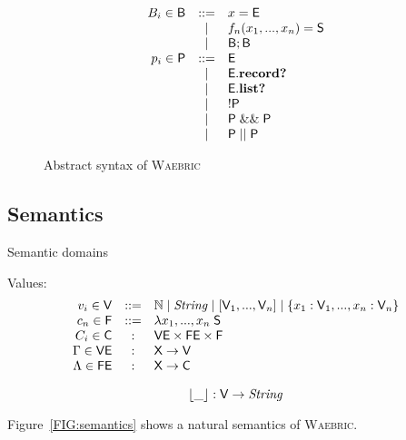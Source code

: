 \documentclass[a4paper]{article}
\def\waebric{\textsc{Waebric}\xspace}
\def\V#1{\ensuremath{\mbox{\textit{#1}}}}
\def\tostring#1{\ensuremath{\lfloor #1\rfloor}}
\begin{document}
\begin{figure}
\begin{minipage}[t]{0.33\linewidth}
\[\begin{array}{rcl}
\end{array}
\]
\end{minipage}
\begin{minipage}[t]{0.33\linewidth}\small
\[
\begin{array}{rcl}
B_i\in \mathsf{B} & ::= & x = \mathsf{E} \\
& | & f_n(x_1, ..., x_n) = \mathsf{S}\\
& | & \mathsf{B} ; \mathsf{B}\\
p_i \in \mathsf{P} & ::= & \mathsf{E}\\
& | & \mathsf{E}.\text{\textbf{record?}}\\
& | & \mathsf{E}.\text{\textbf{list?}}\\
& | & !\mathsf{P} \\
& | & \mathsf{P}\; \&\&\; \mathsf{P}\\
& | & \mathsf{P}\; ||\; \mathsf{P}\\
\end{array}
\]
\end{minipage}
\caption{Abstract syntax of \waebric\label{FIG:abstract-syntax}}
\end{figure}

\subsection{Semantics}


Semantic domains

Values:
\[
\begin{array}{rcl}
v_i \in \NT{V} &::=& \mathbb{N} \;|\; \V{String} 
\;|\; [\NT{V}_1, ..., \NT{V}_n] \;|\; \{x_1: \NT{V}_1, ..., x_n: \NT{V}_n\}\\
c_n \in \NT{F} &::=& \lambda x_1,...,x_n\; \NT{S}\\
C_i \in \NT{C} &:& \NT{VE} \times\NT{FE} \times\NT{F}\\
\Gamma \in \NT{VE} &:& \NT{X}\rightarrow\NT{V}\\
\Lambda \in \NT{FE} &:& \NT{X}\rightarrow\NT{C}\\
\end{array}
\]


\[
\tostring{\_}: \NT{V} \rightarrow \V{String}
\]


Figure~\ref{FIG:semantics} shows a natural semantics of \waebric.
\end{document}
